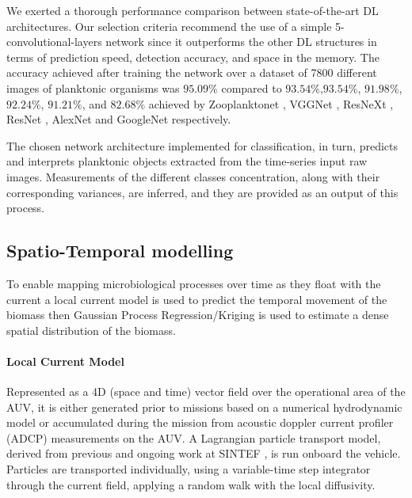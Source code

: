 \documentclass[conference]{IEEEtran}
\begin{document}
We exerted a thorough performance comparison between state-of-the-art DL architectures. Our selection criteria recommend the use of a simple 5-convolutional-layers network since it outperforms the other DL structures in terms of prediction speed, detection accuracy, and space in the memory. The accuracy achieved after training the network over a dataset of 7800 different images of planktonic organisms was $95.09\%$ compared to $93.54\%$,$93.54\%$, $91.98\%$, $92.24\%$, $91.21\%$, and $82.68\%$ achieved by Zooplanktonet \cite{dai2016zooplanktonet}, VGGNet \cite{simonyan2014very}, ResNeXt \cite{xie2017aggregated}, ResNet  \cite{he2016deep}, AlexNet \cite{krizhevsky2012imagenet} and GoogleNet  \cite{szegedy2015going} respectively. 

The chosen network architecture implemented for classification, in turn, predicts and interprets planktonic objects extracted from the time-series input raw images. Measurements of the different classes concentration, along with their corresponding variances, are inferred, and they are provided as an output of this process.

\subsection{Spatio-Temporal modelling}
To enable mapping microbiological processes over time as they float with the current a local current model is used to predict the temporal movement of the biomass then Gaussian Process Regression/Kriging is used to estimate a dense spatial distribution of the biomass.

\paragraph{Local Current Model}
Represented as a 4D (space and time) vector field over the operational area of the AUV, it is either generated prior to missions based on a numerical hydrodynamic model
or accumulated during the mission from acoustic doppler current profiler (ADCP) measurements on the AUV.
A Lagrangian particle transport model, derived from previous and ongoing
work at SINTEF \cite{Rye2006}, is run onboard the vehicle.
Particles are transported individually, using a variable-time step
integrator %
through the current field, applying a random walk with the local diffusivity.
\end{document}
